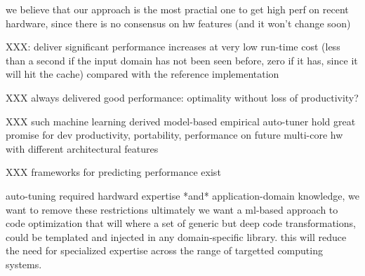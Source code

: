we believe that our approach is the most practial one to get high perf on
recent hardware, since there is no consensus on hw features (and it won't
change soon)

XXX: deliver significant performance increases at very low run-time cost (less
than a second if the input domain has not been seen before, zero if it
has, since it will hit the cache) compared with the reference
implementation

XXX always delivered good performance: optimality without loss of productivity?

XXX such machine learning derived model-based empirical auto-tuner hold great
promise for dev productivity, portability, performance on future multi-core hw
with different architectural features

XXX frameworks for predicting performance exist \cite{XXX}

auto-tuning required hardward expertise *and* application-domain knowledge, we
want to remove these restrictions ultimately we want a ml-based approach to
code optimization that will where a set of generic but deep code
transformations, could be templated and injected in any domain-specific
library. this will reduce the need for specialized expertise across the range
of targetted computing systems.

